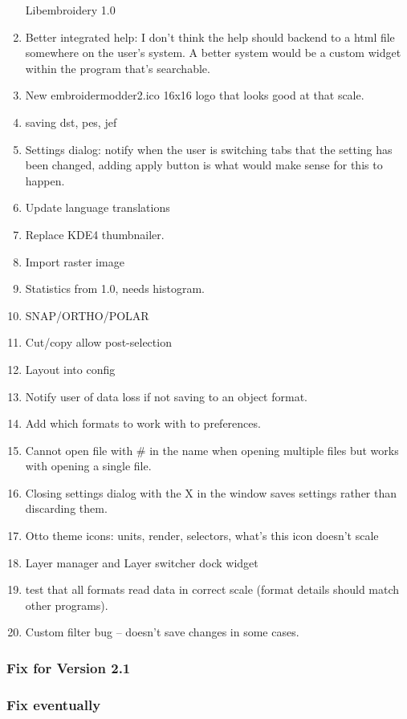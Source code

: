 \documentclass[a4paper, 11pt]{report}
\begin{document}
\begin{enumerate}
  Libembroidery 1.0
\item
  Better integrated help: I don't think the help should backend to a
  html file somewhere on the user's system. A better system would be a
  custom widget within the program that's searchable.
\item
  New embroidermodder2.ico 16x16 logo that looks good at that scale.
\item
  saving dst, pes, jef
\item
  Settings dialog: notify when the user is switching tabs that the
  setting has been changed, adding apply button is what would make sense
  for this to happen.
\item
  Update language translations
\item
  Replace KDE4 thumbnailer.
\item
  Import raster image
\item
  Statistics from 1.0, needs histogram.
\item
  SNAP/ORTHO/POLAR
\item
  Cut/copy allow post-selection
\item
  Layout into config
\item
  Notify user of data loss if not saving to an object format.
\item
  Add which formats to work with to preferences.
\item
  Cannot open file with \# in the name when opening multiple files but
  works with opening a single file.
\item
  Closing settings dialog with the X in the window saves settings rather
  than discarding them.
\item
  Otto theme icons: units, render, selectors, what's this icon doesn't
  scale
\item
  Layer manager and Layer switcher dock widget
\item
  test that all formats read data in correct scale (format details
  should match other programs).
\item
  Custom filter bug -- doesn't save changes in some cases.
\end{enumerate}

\subsubsection{Fix for Version 2.1}
\label{fix-for-version-2.1}

\subsubsection{Fix eventually}
\label{fix-eventually}
\end{document}
